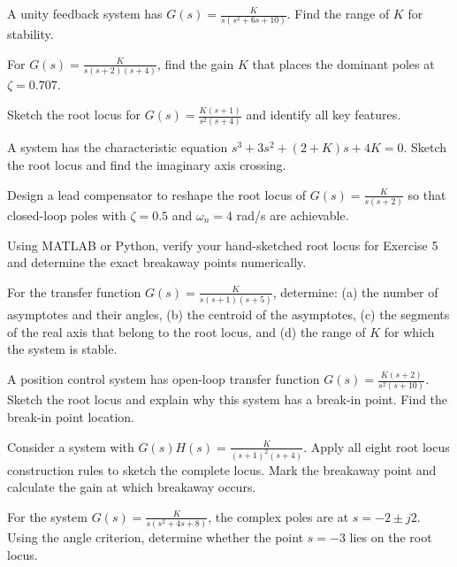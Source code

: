 \begin{exercise}
A unity feedback system has $G(s) = \frac{K}{s(s^2+6s+10)}$. Find the range of $K$ for stability.
\end{exercise}

\begin{exercise}
For $G(s) = \frac{K}{s(s+2)(s+4)}$, find the gain $K$ that places the dominant poles at $\zeta = 0.707$.
\end{exercise}

\begin{exercise}
Sketch the root locus for $G(s) = \frac{K(s+1)}{s^2(s+4)}$ and identify all key features.
\end{exercise}

\begin{exercise}
A system has the characteristic equation $s^3 + 3s^2 + (2+K)s + 4K = 0$. Sketch the root locus and find the imaginary axis crossing.
\end{exercise}

\begin{exercise}
Design a lead compensator to reshape the root locus of $G(s) = \frac{K}{s(s+2)}$ so that closed-loop poles with $\zeta = 0.5$ and $\omega_n = 4$ rad/s are achievable.
\end{exercise}

\begin{exercise}
Using MATLAB or Python, verify your hand-sketched root locus for Exercise 5 and determine the exact breakaway points numerically.
\end{exercise}

\begin{exercise}
For the transfer function $G(s) = \frac{K}{s(s+1)(s+5)}$, determine: (a) the number of asymptotes and their angles, (b) the centroid of the asymptotes, (c) the segments of the real axis that belong to the root locus, and (d) the range of $K$ for which the system is stable.
\end{exercise}

\begin{exercise}
A position control system has open-loop transfer function $G(s) = \frac{K(s+2)}{s^2(s+10)}$. Sketch the root locus and explain why this system has a break-in point. Find the break-in point location.
\end{exercise}

\begin{exercise}
Consider a system with $G(s)H(s) = \frac{K}{(s+1)^2(s+4)}$. Apply all eight root locus construction rules to sketch the complete locus. Mark the breakaway point and calculate the gain at which breakaway occurs.
\end{exercise}

\begin{exercise}
For the system $G(s) = \frac{K}{s(s^2+4s+8)}$, the complex poles are at $s = -2 \pm j2$. Using the angle criterion, determine whether the point $s = -3$ lies on the root locus.
\end{exercise}


